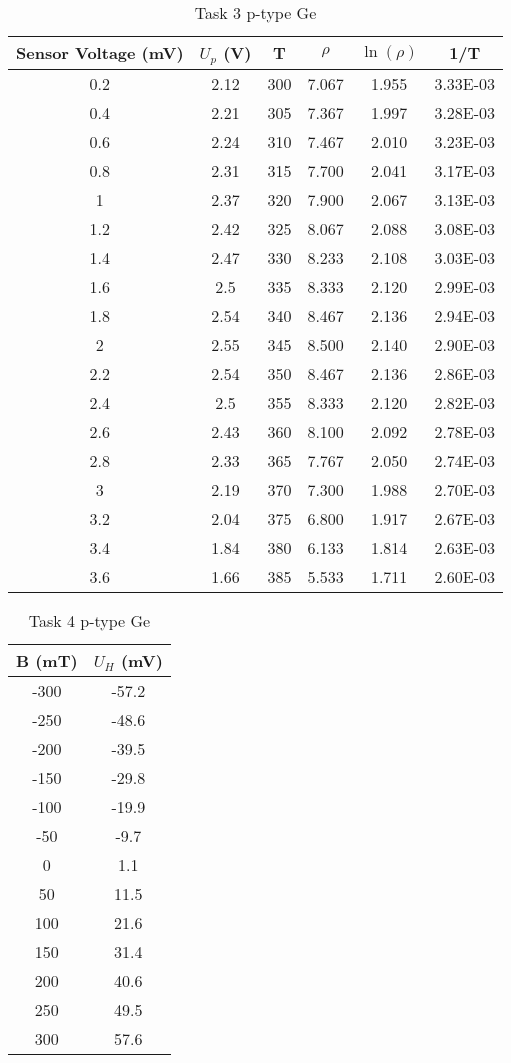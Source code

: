 \documentclass[11pt]{article}
\begin{document}
	\begin{table}[htbp]
		\centering
		\caption{Task 3 p-type Ge}
		\begin{tabular}{cccccc}
			\toprule
			Sensor Voltage (mV) & $U_p$ (V) & T & $\rho$ & $\ln(\rho)$ & 1/T \\
			\midrule
			0.2 & 2.12 & 300 & 7.067 & 1.955 & 3.33E-03 \\
			0.4 & 2.21 & 305 & 7.367 & 1.997 & 3.28E-03 \\
			0.6 & 2.24 & 310 & 7.467 & 2.010 & 3.23E-03 \\
			0.8 & 2.31 & 315 & 7.700 & 2.041 & 3.17E-03 \\
			1 & 2.37 & 320 & 7.900 & 2.067 & 3.13E-03 \\
			1.2 & 2.42 & 325 & 8.067 & 2.088 & 3.08E-03 \\
			1.4 & 2.47 & 330 & 8.233 & 2.108 & 3.03E-03 \\
			1.6 & 2.5 & 335 & 8.333 & 2.120 & 2.99E-03 \\
			1.8 & 2.54 & 340 & 8.467 & 2.136 & 2.94E-03 \\
			2 & 2.55 & 345 & 8.500 & 2.140 & 2.90E-03 \\
			2.2 & 2.54 & 350 & 8.467 & 2.136 & 2.86E-03 \\
			2.4 & 2.5 & 355 & 8.333 & 2.120 & 2.82E-03 \\
			2.6 & 2.43 & 360 & 8.100 & 2.092 & 2.78E-03 \\
			2.8 & 2.33 & 365 & 7.767 & 2.050 & 2.74E-03 \\
			3 & 2.19 & 370 & 7.300 & 1.988 & 2.70E-03 \\
			3.2 & 2.04 & 375 & 6.800 & 1.917 & 2.67E-03 \\
			3.4 & 1.84 & 380 & 6.133 & 1.814 & 2.63E-03 \\
			3.6 & 1.66 & 385 & 5.533 & 1.711 & 2.60E-03 \\
			\bottomrule
		\end{tabular}%
		\label{tab:6}%
	\end{table}%
	
	\begin{table}[htbp]
		\centering
		\caption{Task 4 p-type Ge}
		\begin{tabular}{cc}
			\toprule
			B (mT) & $U_H$ (mV) \\
			\midrule
			-300 & -57.2 \\
			-250 & -48.6 \\
			-200 & -39.5 \\
			-150 & -29.8 \\
			-100 & -19.9 \\
			-50 & -9.7 \\
			0 & 1.1 \\
			50 & 11.5 \\
			100 & 21.6 \\
			150 & 31.4 \\
			200 & 40.6 \\
			250 & 49.5 \\
			300 & 57.6 \\
			\bottomrule
		\end{tabular}%
		\label{tab:7}%
	\end{table}%
	
\end{document}
